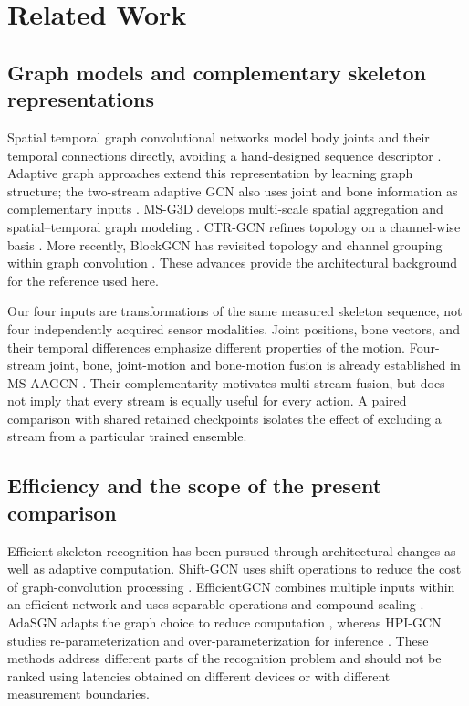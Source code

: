 \documentclass[ai,article,submit,moreauthors]{Definitions/mdpi}
\begin{document}
\section{Related Work}
\subsection{Graph models and complementary skeleton representations}
Spatial temporal graph convolutional networks model body joints and their temporal connections directly, avoiding a hand-designed sequence descriptor \cite{yan2018stgcn}. Adaptive graph approaches extend this representation by learning graph structure; the two-stream adaptive GCN also uses joint and bone information as complementary inputs \cite{shi2019twostream}. MS-G3D develops multi-scale spatial aggregation and spatial--temporal graph modeling \cite{liu2020msg3d}. CTR-GCN refines topology on a channel-wise basis \cite{chen2021ctrgcn}. More recently, BlockGCN has revisited topology and channel grouping within graph convolution \cite{zhou2024blockgcn}. These advances provide the architectural background for the reference used here.

Our four inputs are transformations of the same measured skeleton sequence, not four independently acquired sensor modalities. Joint positions, bone vectors, and their temporal differences emphasize different properties of the motion. Four-stream joint, bone, joint-motion and bone-motion fusion is already established in MS-AAGCN \cite{shi2020multistream}. Their complementarity motivates multi-stream fusion, but does not imply that every stream is equally useful for every action. A paired comparison with shared retained checkpoints isolates the effect of excluding a stream from a particular trained ensemble.

\subsection{Efficiency and the scope of the present comparison}
Efficient skeleton recognition has been pursued through architectural changes as well as adaptive computation. Shift-GCN uses shift operations to reduce the cost of graph-convolution processing \cite{cheng2020shiftgcn}. EfficientGCN combines multiple inputs within an efficient network and uses separable operations and compound scaling \cite{song2022efficientgcn}. AdaSGN adapts the graph choice to reduce computation \cite{shi2021adasgn}, whereas HPI-GCN studies re-parameterization and over-parameterization for inference \cite{wang2025hpi}. These methods address different parts of the recognition problem and should not be ranked using latencies obtained on different devices or with different measurement boundaries.
\end{document}
